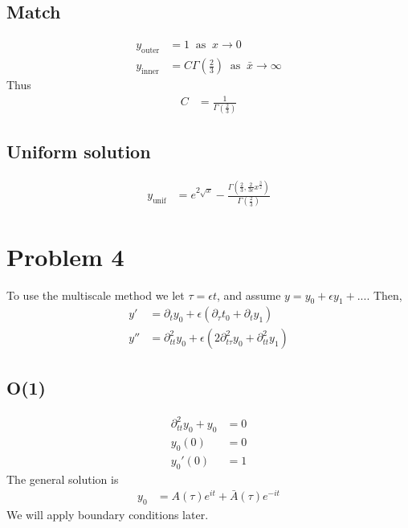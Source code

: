 \documentclass[12pt]{article}
\newcommand{\eq}[1]{\begin{align*}#1\end{align*}}
\newcommand{\on}[1]{\operatorname{#1}}
\newcommand{\p}[1]{\partial_{#1}}
\newcommand{\pp}[1]{\partial^2_{#1}}
\begin{document}
\subsection*{Match}
\eq{
	y_{\on{outer}} &= 1\;\on{as}\;x \rightarrow 0\\
	y_{\on{inner}} &= C\Gamma(\frac{2}{3})\;\on{as}\;\bar{x} \rightarrow \infty
}
Thus
\eq{
	C &= \frac{1}{\Gamma(\frac{2}{3})}
}
\subsection*{Uniform solution}
\eq{
	y_{\on{unif}} &= e^{2\sqrt{x}} - \frac{\Gamma(\frac{2}{3}, \frac{2}{3\epsilon}x^{\frac{3}{2}})}{\Gamma(\frac{2}{3})}
}
\section*{Problem 4}
To use the multiscale method we let $\tau = \epsilon t$, and assume $y = y_0 + \epsilon y_1 + ...$. Then,
\eq{
	y' &= \p{t}y_0 + \epsilon(\p{\tau}t_0 + \p{t}y_1)\\
	y'' &= \pp{tt}y_0 + \epsilon(2\pp{t\tau}y_0 + \pp{tt}y_1)
}
\subsection*{O(1)}
\eq{
	\pp{tt}y_0 + y_0 &= 0\\
	y_0(0) &= 0\\
	y_0'(0) &= 1
}
The general solution is
\eq{
	y_0 &= A(\tau)e^{it} + \bar{A}(\tau)e^{-it}
}
We will apply boundary conditions later.
\end{document}
